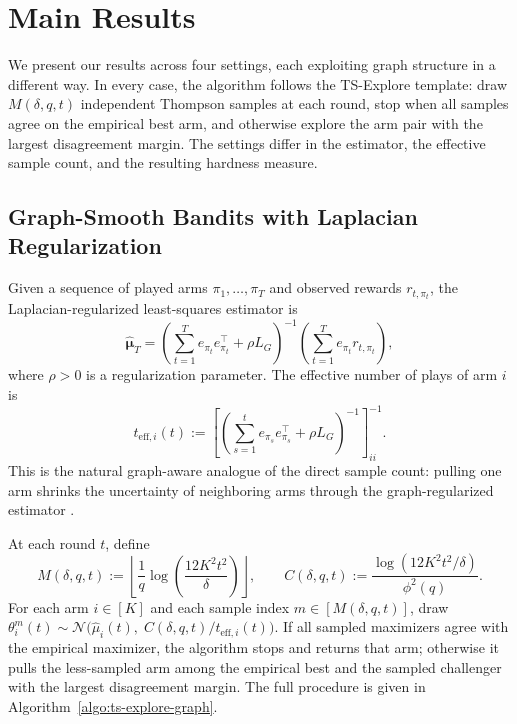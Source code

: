 \documentclass{article}
\begin{document}
\section{Main Results}\label{sec:main-results}

We present our results across four settings, each exploiting graph structure in a different way. In every case, the algorithm follows the TS-Explore template: draw $M(\delta,q,t)$ independent Thompson samples at each round, stop when all samples agree on the empirical best arm, and otherwise explore the arm pair with the largest disagreement margin. The settings differ in the estimator, the effective sample count, and the resulting hardness measure.


\subsection{Graph-Smooth Bandits with Laplacian Regularization}\label{sec:graph-smooth}

Given a sequence of played arms $\pi_1,\dots,\pi_T$ and observed rewards $r_{t,\pi_t}$, the Laplacian-regularized least-squares estimator is
\begin{equation}
\widehat{\bm\mu}_T
=
\left(
\sum_{t=1}^T e_{\pi_t}e_{\pi_t}^\top+\rho L_G
\right)^{-1}
\left(
\sum_{t=1}^T e_{\pi_t}r_{t,\pi_t}
\right),
\label{eq:lap-reg-closed}
\end{equation}
where $\rho > 0$ is a regularization parameter. The effective number of plays of arm $i$ is
\[
t_{\mathrm{eff},i}(t)
:=
\left[
\left(
\sum_{s=1}^t e_{\pi_s}e_{\pi_s}^\top+\rho L_G
\right)^{-1}
\right]_{ii}^{-1}.
\]
This is the natural graph-aware analogue of the direct sample count: pulling one arm shrinks the uncertainty of neighboring arms through the graph-regularized estimator \citep{thaker2022maximizing, abbasi2011improved}.

At each round $t$, define
\[
M(\delta,q,t)
:=
\left\lfloor \frac{1}{q}\log\!\left(\frac{12K^2t^2}{\delta}\right)\right\rfloor,
\qquad
C(\delta,q,t)
:=
\frac{\log(12K^2t^2/\delta)}{\phi^2(q)}.
\]
For each arm $i\in[K]$ and each sample index $m\in[M(\delta,q,t)]$, draw $\theta_i^m(t)\sim \mathcal N\bigl(\widehat\mu_i(t),\;C(\delta,q,t)/t_{\mathrm{eff},i}(t)\bigr)$.
If all sampled maximizers agree with the empirical maximizer, the algorithm stops and returns that arm; otherwise it pulls the less-sampled arm among the empirical best and the sampled challenger with the largest disagreement margin. The full procedure is given in Algorithm~\ref{algo:ts-explore-graph}.
\end{document}
